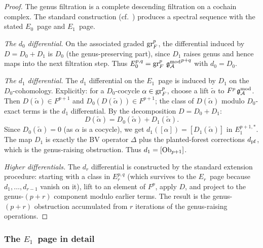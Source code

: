 \begin{proof}
The genus filtration is a complete descending filtration on a
cochain complex. The standard construction (cf.\
\cite[Ch.~5]{Wei94}) produces a spectral sequence with the
stated $E_0$~page and $E_1$~page.

\medskip\noindent\emph{The $d_0$ differential.}
On the associated graded $\operatorname{gr}^p_F$, the differential induced by
$D = D_0 + D_1$ is $D_0$ (the genus-preserving part), since
$D_1$ raises genus and hence maps into the next filtration step.
Thus $E_0^{p,q} = \operatorname{gr}^p_F\,{\mathfrak{g}_{\mathcal{A}}^{\mathrm{mod}}}^{p+q}$ with $d_0 = D_0$.

\medskip\noindent\emph{The $d_1$ differential.}
The $d_1$ differential on the $E_1$~page is induced by $D_1$
on the $D_0$-cohomology. Explicitly: for a $D_0$-cocycle
$\alpha \in \operatorname{gr}^p_F$, choose a lift $\widetilde{\alpha}$ to
$F^p\,\mathfrak{g}_{\mathcal{A}}^{\mathrm{mod}}$. Then $D(\widetilde{\alpha}) \in F^{p+1}$ and
$D_0(D(\widetilde{\alpha})) \in F^{p+1}$; the class of
$D(\widetilde{\alpha})$ modulo $D_0$-exact terms is the $d_1$
differential. By the decomposition $D = D_0 + D_1$:
\[
D(\widetilde{\alpha})
= D_0(\widetilde{\alpha}) + D_1(\widetilde{\alpha}).
\]
Since $D_0(\widetilde{\alpha}) = 0$ (as $\alpha$ is a cocycle),
we get $d_1([\alpha]) = [D_1(\widetilde{\alpha})]$ in
$E_1^{p+1,*}$. The map $D_1$ is exactly the BV operator
$\Delta$ plus the planted-forest corrections $d_{\mathrm{pf}}$, which is
the genus-raising obstruction. Thus $d_1 = [\mathrm{Ob}_{p+1}]$.

\medskip\noindent\emph{Higher differentials.}
The $d_r$ differential is constructed by the standard
extension procedure: starting with a class in $E_r^{p,q}$
(which survives to the $E_r$~page because $d_1, \ldots,
d_{r-1}$ vanish on it), lift to an element of $F^p$, apply
$D$, and project to the genus-$(p{+}r)$ component modulo
earlier terms. The result is the genus-$(p{+}r)$ obstruction
accumulated from $r$ iterations of the genus-raising operations.
\end{proof}

\subsubsection{The $E_1$~page in detail}
\label{subsubsec:thqg-VII-E1-detail}

